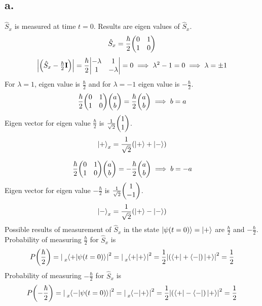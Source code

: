 \documentclass[12pt]{article}
\begin{document}
\subsection*{a.}
$\hat{S}_x$ is measured at time $t=0$. Results are eigen values of $\hat{S}_x$.
\[\hat{S}_x=\frac{\hbar}{2}\mqty(\pmat{1})\]
\[\mqty|\qty(\hat{S}_x-\frac{\hbar}{2}\vb{I})|=\frac{\hbar}{2}\mqty|\begin{matrix}-\lambda & 1 \\ 1& -\lambda\end{matrix}|=0\implies\lambda^2-1=0\implies\lambda=\pm 1\]
For $\lambda=1$, eigen value is $\frac{\hbar}{2}$ and for $\lambda=-1$ eigen value is $-\frac{\hbar}{2}$.
\[\frac{\hbar}{2}\mqty(\pmat{1})\mqty(\begin{matrix}a\\b\end{matrix})=\frac{\hbar}{2}\mqty(\begin{matrix}a\\b\end{matrix})\implies b=a\]
Eigen vector for eigen value $\frac{\hbar}{2}$ is $\frac{1}{\sqrt{2}}\mqty(\begin{matrix}1\\1\end{matrix})$.
\[\ket{+}_x=\frac{1}{\sqrt{2}}\qty(\ket{+}+\ket{-})\]

\[\frac{\hbar}{2}\mqty(\pmat{1})\mqty(\begin{matrix}a\\b\end{matrix})=-\frac{\hbar}{2}\mqty(\begin{matrix}a\\b\end{matrix})\implies b=-a\]
Eigen vector for eigen value $-\frac{\hbar}{2}$ is $\frac{1}{\sqrt{2}}\mqty(\begin{matrix}1\\-1\end{matrix})$.
\[\ket{-}_x=\frac{1}{\sqrt{2}}\qty(\ket{+}-\ket{-})\]
Possible results of measurement of $\hat{S}_x$ in the state $\ket{\psi(t=0)}=\ket{+}$ are $\frac{\hbar}{2}$ and $-\frac{\hbar}{2}$.
Probability of measuring $\frac{\hbar}{2}$ for $\hat{S}_x$ is 
\[P\qty(\frac{\hbar}{2})=\abs{\tensor*[_x]{\braket{+}{\psi(t=0)}}{}}^2=\abs{\tensor*[_x]{\braket{+}{+}}{}}^2=\frac{1}{2}\abs{\qty(\bra{+}+\bra{-})\ket{+}}^2=\frac{1}{2}\]
Probability of measuring $-\frac{\hbar}{2}$ for $\hat{S}_x$ is 
\[P\qty(-\frac{\hbar}{2})=\abs{\tensor*[_x]{\braket{-}{\psi(t=0)}}{}}^2=\abs{\tensor*[_x]{\braket{-}{+}}{}}^2=\frac{1}{2}\abs{\qty(\bra{+}-\bra{-})\ket{+}}^2=\frac{1}{2}\]
\end{document}
